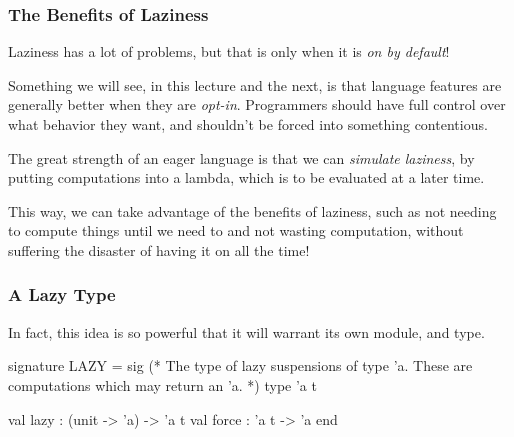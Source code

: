 \documentclass[aspectratio=169]{beamer}
\begin{document}
\begin{frame}[fragile]
  \frametitle{The Benefits of Laziness}

  Laziness has a lot of problems, but that is only when it is \textit{on by default}!

  \pause
  \vspace{\fill}

  Something we will see, in this lecture and the next, is that language features are
  generally better when they are \textit{opt-in}. Programmers should have full
  control over what behavior they want, and shouldn't be forced into something
  contentious.

  \pause
  \vspace{\fill}

  The great strength of an eager language is that we can \textit{simulate laziness},
  by putting computations into a lambda, which is to be evaluated at a later time.

  \pause
  \vspace{\fill}

  This way, we can take advantage of the benefits of laziness, such as not needing
  to compute things until we need to and not wasting computation, without
  suffering the disaster of having it on all the time!
\end{frame}


\begin{frame}[fragile]
  \frametitle{A Lazy Type}

  In fact, this idea is so powerful that it will warrant its own module, and type.

  \pause
  \vspace{\fill}

  \begin{codeblock}
    signature LAZY =
      sig
        (* The type of lazy suspensions of type 'a. These are
           computations which may return an 'a.
         *)
        type 'a t

        val lazy : (unit -> 'a) -> 'a t
        val force : 'a t -> 'a
      end
  \end{codeblock}
\end{frame}
\end{document}
